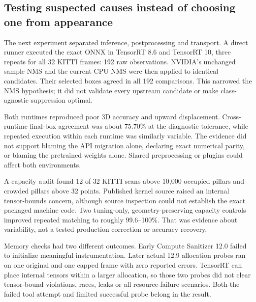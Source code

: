 \documentclass[11pt,a4paper]{article}
\begin{document}
\subsection{Testing suspected causes instead of choosing one from appearance}

The next experiment separated inference, postprocessing and transport. A direct runner executed the exact ONNX in TensorRT 8.6 and TensorRT 10, three repeats for all 32 KITTI frames: 192 raw observations. NVIDIA's unchanged sample NMS and the current CPU NMS were then applied to identical candidates. Their selected boxes agreed in all 192 comparisons. This narrowed the NMS hypothesis; it did not validate every upstream candidate or make class-agnostic suppression optimal.

Both runtimes reproduced poor 3D accuracy and upward displacement. Cross-runtime final-box agreement was about 75.70\% at the diagnostic tolerance, while repeated execution within each runtime was similarly variable. The evidence did not support blaming the API migration alone, declaring exact numerical parity, or blaming the pretrained weights alone. Shared preprocessing or plugins could affect both environments.

A capacity audit found 12 of 32 KITTI scans above 10,000 occupied pillars and crowded pillars above 32 points. Published kernel source raised an internal tensor-bounds concern, although source inspection could not establish the exact packaged machine code. Two tuning-only, geometry-preserving capacity controls improved repeated matching to roughly 99.6–100\%. That was evidence about variability, not a tested production correction or accuracy recovery.

Memory checks had two different outcomes. Early Compute Sanitizer 12.0 failed to initialize meaningful instrumentation. Later actual 12.9 allocation probes ran on one original and one capped frame with zero reported errors. TensorRT can place internal tensors within a larger allocation, so those two probes did not clear tensor-bound violations, races, leaks or all resource-failure scenarios. Both the failed tool attempt and limited successful probe belong in the result.
\end{document}
